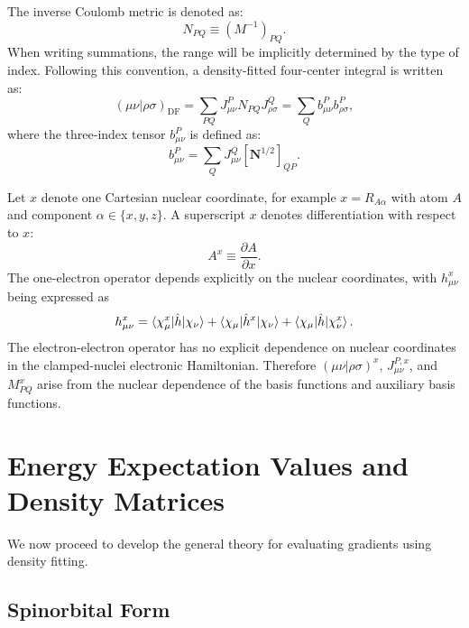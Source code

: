 \documentclass[aip,preprint]{revtex4-1}
\newcommand{\df}{\mathrm{DF}}
\newcommand{\pert}{x}
\begin{document}
The inverse Coulomb metric is denoted as:
\begin{equation}
N_{PQ} \equiv (M^{-1})_{PQ}.
\end{equation}
When writing summations, the range will be implicitly determined by the type of index.
Following this convention, a density-fitted four-center integral is written as:
\begin{equation}
(\mu\nu|\rho\sigma)_\df
= \sum_{PQ} J^P_{\mu\nu} N_{PQ} J^Q_{\rho\sigma}
= \sum_{Q} b^{P}_{\mu \nu} b^{P}_{\rho\sigma},
\label{eq:df_eri}
\end{equation}
where the three-index tensor $b^{P}_{\mu \nu}$ is defined as:
\begin{equation}
b^{P}_{\mu \nu} = \sum_{Q} J^Q_{\mu\nu} [\mathbf{N}^{1/2}]_{QP}.
\end{equation}

Let $x$ denote one Cartesian nuclear coordinate, for example
$x = R_{A\alpha}$ with atom $A$ and component
$\alpha \in \{x,y,z\}$.  A superscript $\pert$ denotes differentiation with
respect to $x$:
\begin{equation}
A^{\pert} \equiv \frac{\partial A}{\partial x}.
\end{equation}
The one-electron operator depends explicitly on the nuclear coordinates, with $h^{\pert}_{\mu\nu}$ being expressed as
\begin{equation}
h^{\pert}_{\mu\nu} = 
\braket{\chi^{\pert}_\mu|\hat{h}|\chi_\nu}
+ \braket{\chi_\mu|\hat{h}^{\pert}|\chi_\nu} 
+ \braket{\chi_\mu|\hat{h}|\chi^{\pert}_\nu}.
\end{equation}
The electron-electron operator has no explicit dependence on nuclear
coordinates in the clamped-nuclei electronic Hamiltonian.  Therefore
$(\mu\nu|\rho\sigma)^{\pert}$, $J^{P,\pert}_{\mu\nu}$, and $M^{\pert}_{PQ}$ arise from
the nuclear dependence of the basis functions and auxiliary basis functions.

\section{Energy Expectation Values and Density Matrices}

We now proceed to develop the general theory for evaluating gradients using density fitting.

\subsection{Spinorbital Form}
\end{document}
